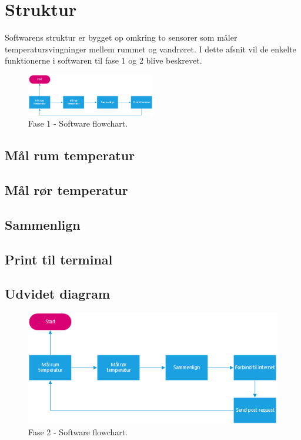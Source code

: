 \section{Struktur}
Softwarens struktur er bygget op omkring to sensorer som måler temperatursvingninger mellem rummet og vandrøret. I dette afsnit vil de enkelte funktionerne i softwaren til fase 1 og 2 blive beskrevet. 
\begin{figure}[h!]
  \centering
  \includegraphics[width=0.5\textwidth]{figures/Fase1software.png}
  \caption{Fase 1 - Software flowchart.}
\end{figure}


\subsection{Mål rum temperatur}
\subsection{Mål rør temperatur}
\subsection{Sammenlign}
\subsection{Print til terminal}

\subsection{Udvidet diagram}
\begin{figure}[h!]
  \centering
  \includegraphics[width=1\textwidth]{figures/Fase2software.png}
  \caption{Fase 2 - Software flowchart.}
\end{figure}